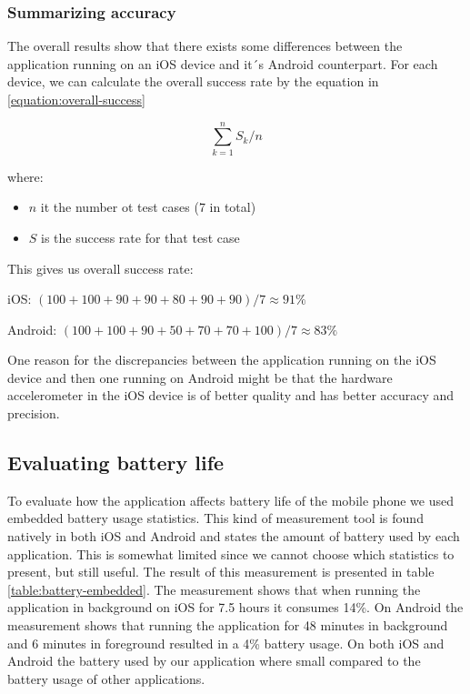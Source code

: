 \documentclass[12pt, a4paper, onecolumn]{article}
\begin{document}
	\subsubsection{Summarizing accuracy}
	The overall results show that there exists some differences between the application running on an iOS device and it´s Android counterpart. For each device, we can calculate the overall success rate by the equation in \ref{equation:overall-success}
	
	\begin{equation}
	\label{equation:overall-success}
	\sum_{k=1}^{n} S_{k} / n
	\end{equation}
	
	where:
	\begin{itemize}
		\item $n$ it the number ot test cases (7 in total)
		\item  $S$ is the success rate for that test case
	\end{itemize}
	
	
	This gives us overall success rate: 
	
	iOS: $(100 + 100 + 90 + 90 + 80 + 90 + 90) / 7 ≈ 91\%$
	
	
	Android: $(100 +100 +90 +50 +70  + 70 + 100) / 7 ≈ 83\%$
	
	
	One reason for the discrepancies between the application running on the iOS device and then one running on Android might be that the hardware accelerometer in the iOS device is of better quality and has better accuracy and precision. 
	
	\subsection{Evaluating battery life}
	
	To evaluate how the application affects battery life of the mobile phone we used embedded battery usage statistics. This kind of measurement tool is found natively in both iOS and Android and states the amount of battery used by each application. This is somewhat limited since we cannot choose which statistics to present, but still useful. The result of this measurement is presented in table \ref{table:battery-embedded}. The measurement shows that when running the application in background on iOS for 7.5 hours it consumes 14\%. On Android the measurement shows that running the application for 48 minutes in background and 6 minutes in foreground resulted in a 4\% battery usage. On both iOS and Android the battery used by our application where small compared to the battery usage of other applications.
	
\end{document}
